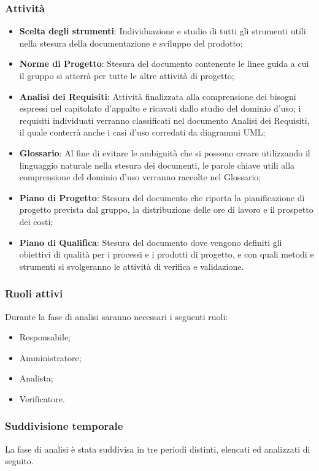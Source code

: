 \subsubsection{Attività}
\begin{itemize}
	\item \textbf{Scelta degli strumenti}: Individuazione e studio di tutti gli strumenti utili nella stesura della documentazione e sviluppo del prodotto;
    \item \textbf{Norme di Progetto}: Stesura del documento contenente le linee guida a cui il gruppo si atterrà per tutte le altre attività di progetto;
    \item \textbf{Analisi dei Requisiti}: Attività finalizzata alla comprensione dei bisogni espressi nel capitolato d’appalto e ricavati dallo studio del dominio d’uso; i requisiti individuati verranno classificati nel documento Analisi dei Requisiti, il quale conterrà anche i casi d’uso corredati da diagrammi UML;
    \item \textbf{Glossario}: Al fine di evitare le ambiguità che si possono creare utilizzando il linguaggio naturale nella stesura dei documenti, le parole chiave utili alla comprensione del dominio d’uso verranno raccolte nel Glossario;
    \item \textbf{Piano di Progetto}: Stesura del documento che riporta la pianificazione di progetto prevista dal gruppo, la distribuzione delle ore di lavoro e il prospetto dei costi;
    \item \textbf{Piano di Qualifica}: Stesura del documento dove vengono definiti gli obiettivi di qualità per i processi e i prodotti di progetto, e con quali metodi e strumenti si svolgeranno le attività di verifica e validazione.
\end{itemize}

\subsubsection{Ruoli attivi}
Durante la fase di analisi saranno necessari i seguenti ruoli:
\begin{itemize}
	\item Responsabile;
    \item Amministratore;
    \item Analista;
    \item Verificatore.
\end{itemize}

\subsubsection{Suddivisione temporale}
La fase di analisi è stata suddivisa in tre periodi distinti, elencati ed analizzati di seguito.

